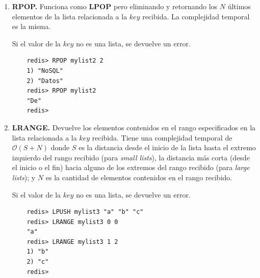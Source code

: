 \documentclass[pdflatex,sn-mathphys-num]{sn-jnl}
\theoremstyle{thmstyleone}%
\theoremstyle{thmstyletwo}%
\theoremstyle{thmstylethree}%
\begin{document}
\begin{enumerate}
    \item \textbf{RPOP.} Funciona como \textbf{LPOP} pero eliminando y retornando los $N$ últimos elementos de la lista relacionada a la $key$ recibida. La complejidad temporal es la misma.

    Si el valor de la $key$ no es una lista, se devuelve un error.

    \begin{verbatim}
    redis> RPOP mylist2 2
    1) "NoSQL"
    2) "Datos"
    redis> RPOP mylist2
    "De"
    redis>
    \end{verbatim}

    \vspace{-0.5cm}
    
    \item \textbf{LRANGE.} Devuelve los elementos contenidos en el rango especificados en la lista relacionada a la $key$ recibida. Tiene una complejidad temporal de $\mathcal{O}(S + N)$ donde $S$ es la distancia desde el inicio de la lista hasta el extremo izquierdo del rango recibido (para \textit{small lists}), la distancia más corta (desde el inicio o el fin) hacia alguno de los extremos del rango recibido (para \textit{large lists}); y $N$ es la cantidad de elementos contenidos en el rango recibido.

    Si el valor de la $key$ no es una lista, se devuelve un error.
    
    \begin{verbatim}
    redis> LPUSH mylist3 "a" "b" "c"
    redis> LRANGE mylist3 0 0
    "a"
    redis> LRANGE mylist3 1 2
    1) "b"
    2) "c"
    redis>
    \end{verbatim}

    \vspace{-0.5cm}
    
    
    




\end{enumerate}
\end{document}
